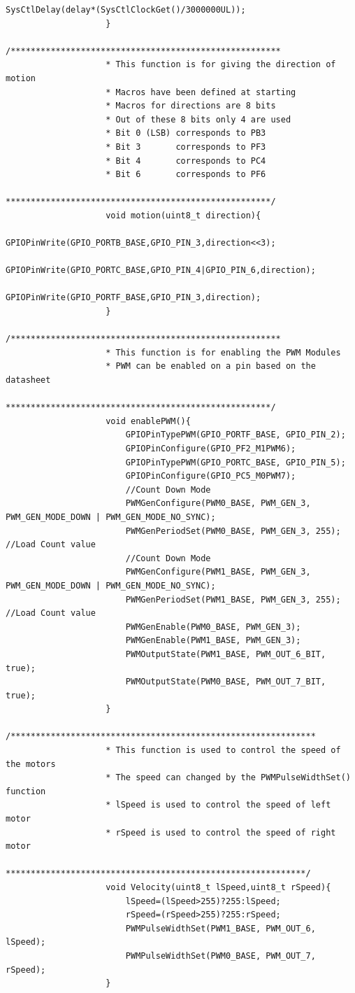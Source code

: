 \documentclass[a4paper,12pt,oneside]{article}
\begin{document}
\begin{lstlisting}[style=CStyle]
						SysCtlDelay(delay*(SysCtlClockGet()/3000000UL));
					}
					/******************************************************
					* This function is for giving the direction of motion
					* Macros have been defined at starting
					* Macros for directions are 8 bits
					* Out of these 8 bits only 4 are used
					* Bit 0 (LSB) corresponds to PB3
					* Bit 3       corresponds to PF3
					* Bit 4       corresponds to PC4
					* Bit 6       corresponds to PF6
					*****************************************************/
					void motion(uint8_t direction){
						GPIOPinWrite(GPIO_PORTB_BASE,GPIO_PIN_3,direction<<3);
						GPIOPinWrite(GPIO_PORTC_BASE,GPIO_PIN_4|GPIO_PIN_6,direction);
						GPIOPinWrite(GPIO_PORTF_BASE,GPIO_PIN_3,direction);
					}
					/******************************************************
					* This function is for enabling the PWM Modules
					* PWM can be enabled on a pin based on the datasheet
					*****************************************************/
					void enablePWM(){
						GPIOPinTypePWM(GPIO_PORTF_BASE, GPIO_PIN_2);
						GPIOPinConfigure(GPIO_PF2_M1PWM6);
						GPIOPinTypePWM(GPIO_PORTC_BASE, GPIO_PIN_5);
						GPIOPinConfigure(GPIO_PC5_M0PWM7);
						//Count Down Mode
						PWMGenConfigure(PWM0_BASE, PWM_GEN_3, PWM_GEN_MODE_DOWN | PWM_GEN_MODE_NO_SYNC);
						PWMGenPeriodSet(PWM0_BASE, PWM_GEN_3, 255); //Load Count value
						//Count Down Mode
						PWMGenConfigure(PWM1_BASE, PWM_GEN_3, PWM_GEN_MODE_DOWN | PWM_GEN_MODE_NO_SYNC);
						PWMGenPeriodSet(PWM1_BASE, PWM_GEN_3, 255); //Load Count value
						PWMGenEnable(PWM0_BASE, PWM_GEN_3);
						PWMGenEnable(PWM1_BASE, PWM_GEN_3);
						PWMOutputState(PWM1_BASE, PWM_OUT_6_BIT, true);
						PWMOutputState(PWM0_BASE, PWM_OUT_7_BIT, true);
					}
					/*************************************************************
					* This function is used to control the speed of the motors
					* The speed can changed by the PWMPulseWidthSet() function
					* lSpeed is used to control the speed of left motor
					* rSpeed is used to control the speed of right motor
					************************************************************/
					void Velocity(uint8_t lSpeed,uint8_t rSpeed){
						lSpeed=(lSpeed>255)?255:lSpeed;
						rSpeed=(rSpeed>255)?255:rSpeed;
						PWMPulseWidthSet(PWM1_BASE, PWM_OUT_6, lSpeed);
						PWMPulseWidthSet(PWM0_BASE, PWM_OUT_7, rSpeed);
					}
				\end{lstlisting}
				
\end{document}
